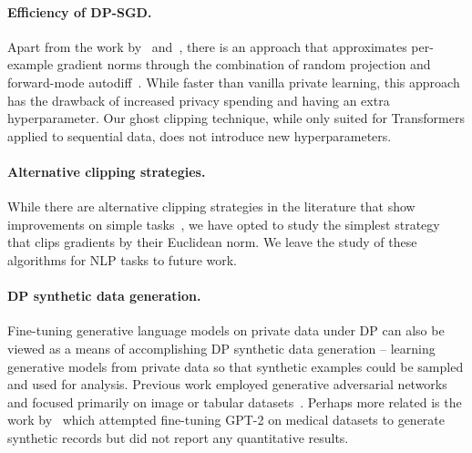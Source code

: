 \paragraph{Efficiency of DP-SGD.}
Apart from the work by~\cite{lee2020scaling} and~\cite{subramani2020enabling}, there is an approach that approximates per-example gradient norms through the combination of random projection and forward-mode autodiff~\citep{bu2021fast}.
While faster than vanilla private learning, this approach has the drawback of increased privacy spending and having an extra hyperparameter.
Our ghost clipping technique, while only suited for Transformers applied to sequential data, does not introduce new hyperparameters.

\paragraph{Alternative clipping strategies.}
While there are alternative clipping strategies in the literature that show improvements on simple tasks~\citep{pichapati2019adaclip,asi2021private}, we have opted to study the simplest strategy that clips gradients by their Euclidean norm.
We leave the study of these algorithms for NLP tasks to future work.

\paragraph{DP synthetic data generation.}
Fine-tuning generative language models on private data under DP can also be viewed as a means of accomplishing DP synthetic data generation -- learning generative models from private data so that synthetic examples could be sampled and used for analysis. 
Previous work employed generative adversarial networks and focused primarily on image or tabular datasets~\citep{torkzadehmahani2019dp,neunhoeffer2020private,chen2020gs,torfi2020differentially}. 
Perhaps more related is the work by~\cite{bommasani19towards} which attempted fine-tuning GPT-2 on medical datasets to generate synthetic records but did not report any quantitative results. 
